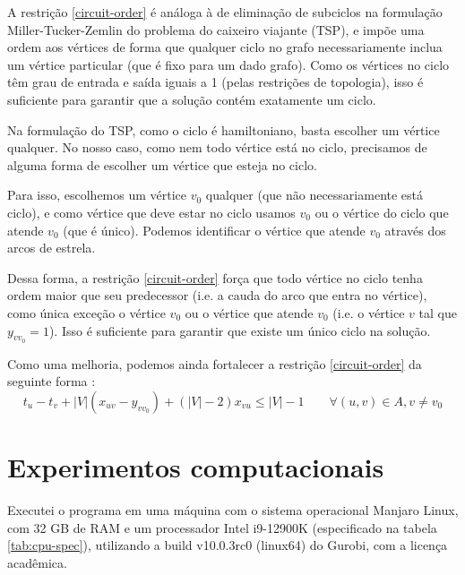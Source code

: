 \documentclass{article}
\begin{document}
A restrição \ref{circuit-order} é análoga à de eliminação de subciclos na formulação Miller-Tucker-Zemlin do problema do caixeiro viajante (TSP), e impõe uma ordem aos vértices de forma que qualquer ciclo no grafo necessariamente inclua um vértice particular (que é fixo para um dado grafo). Como os vértices no ciclo têm grau de entrada e saída iguais a 1 (pelas restrições de topologia), isso é suficiente para garantir que a solução contém exatamente um ciclo.

Na formulação do TSP, como o ciclo é hamiltoniano, basta escolher um vértice qualquer. No nosso caso, como nem todo vértice está no ciclo, precisamos de alguma forma de escolher um vértice que esteja no ciclo.

Para isso, escolhemos um vértice $v_0$ qualquer (que não necessariamente está ciclo), e como vértice que deve estar no ciclo usamos $v_0$ ou o vértice do ciclo que atende $v_0$ (que é único). Podemos identificar o vértice que atende $v_0$ através dos arcos de estrela.

Dessa forma, a restrição \ref{circuit-order} força que todo vértice no ciclo tenha ordem maior que seu predecessor (i.e. a cauda do arco que entra no vértice), como única exceção o vértice $v_0$ ou o vértice que atende $v_0$ (i.e. o vértice $v$ tal que $y_{vv_0} = 1$). Isso é suficiente para garantir que existe um único ciclo na solução.

Como uma melhoria, podemos ainda fortalecer a restrição \ref{circuit-order} da seguinte forma \cite{DESROCHERS199127}:
$$t_u - t_v + |V|(x_{uv} - y_{vv_0}) + (|V| - 2)x_{vu} \leq |V| - 1 \qquad \forall (u, v) \in A, v \neq v_0$$

\section{Experimentos computacionais}

Executei o programa em uma máquina com o sistema operacional Manjaro Linux, com 32 GB de RAM e um processador Intel i9-12900K (especificado na tabela \ref{tab:cpu-spec}), utilizando a build v10.0.3rc0 (linux64) do Gurobi, com a licença acadêmica.
\end{document}
